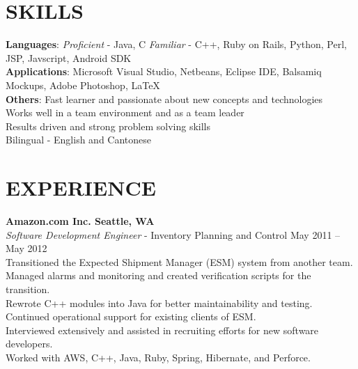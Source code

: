 \documentclass[margin,line]{resume}
\begin{document}
\begin{resume}
    \section{\mysidestyle \textbf{\large{S}\small{KILLS}}}

    \textbf{Languages}: \textsl{Proficient} - Java, C  \textsl{Familiar} - C++, Ruby on Rails, Python, Perl, JSP, Javscript, Android SDK\\
    \textbf{Applications}: Microsoft Visual Studio, Netbeans, Eclipse IDE, Balsamiq Mockups, Adobe Photoshop, \LaTeX\\
    \textbf{Others}: Fast learner and passionate about new concepts and technologies\\
      \hspace*{\identsize} Works well in a team environment and as a team leader\\
      \hspace*{\identsize} Results driven and strong problem solving skills\\
      \hspace*{\identsize} Bilingual - English and Cantonese

\sectionline

    \section{\mysidestyle \textbf{\large{E}\small{XPERIENCE}}}

    \textbf{\listing Amazon.com Inc. \hfill Seattle, WA}\\
    \textsl{Software Development Engineer} - Inventory Planning and Control \hfill May 2011 -- May 2012\\
      \hspace*{\identsize} Transitioned the Expected Shipment Manager (ESM) system from another team.\\
      \hspace*{\identsize} Managed alarms and monitoring and created verification scripts for the transition.\\
      \hspace*{\identsize} Rewrote C++ modules into Java for better maintainability and testing.\\
      \hspace*{\identsize} Continued operational support for existing clients of ESM.\\
      \hspace*{\identsize} Interviewed extensively and assisted in recruiting efforts for new software developers.\\
      \hspace*{\identsize} Worked with AWS, C++, Java, Ruby, Spring, Hibernate, and Perforce.
    \vspace{-2mm}


\end{resume}
\end{document}
